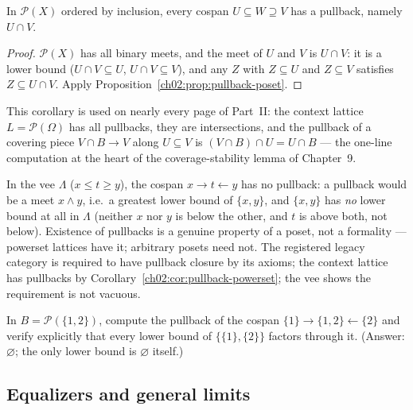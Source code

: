 \begin{corollary}\label{ch02:cor:pullback-powerset}
In $\mathcal{P}(X)$ ordered by inclusion, every cospan
$U \subseteq W \supseteq V$ has a pullback, namely $U \cap V$.
\end{corollary}

\begin{proof}
$\mathcal{P}(X)$ has all binary meets, and the meet of $U$ and $V$ is
$U \cap V$: it is a lower bound ($U \cap V \subseteq U$,
$U \cap V \subseteq V$), and any $Z$ with $Z \subseteq U$ and
$Z \subseteq V$ satisfies $Z \subseteq U \cap V$. Apply
Proposition~\ref{ch02:prop:pullback-poset}.
\end{proof}

This corollary is used on nearly every page of Part~II: the context
lattice $L = \mathcal{P}(\Omega)$ has all pullbacks, they are
intersections, and the pullback of a covering piece $V \cap B \to V$
along $U \subseteq V$ is $(V \cap B) \cap U = U \cap B$ --- the
one-line computation at the heart of the coverage-stability lemma of
Chapter~9.

\begin{example}\label{ch02:ex:no-pullback}
In the vee $\Lambda$ ($x \le t \ge y$), the cospan
$x \to t \leftarrow y$ has no pullback: a pullback would be a meet
$x \wedge y$, i.e.\ a greatest lower bound of $\{x, y\}$, and
$\{x, y\}$ has \emph{no} lower bound at all in $\Lambda$ (neither $x$
nor $y$ is below the other, and $t$ is above both, not below).
Existence of pullbacks is a genuine property of a poset, not a
formality --- powerset lattices have it; arbitrary posets need not.
The registered legacy category is required to have pullback closure by
its axioms; the context lattice has pullbacks by
Corollary~\ref{ch02:cor:pullback-powerset}; the vee shows the
requirement is not vacuous.
\end{example}

\begin{exercise}\label{ch02:exr:pullback-square}
In $B = \mathcal{P}(\{1,2\})$, compute the pullback of the cospan
$\{1\} \to \{1,2\} \leftarrow \{2\}$ and verify explicitly that every
lower bound of $\{\{1\}, \{2\}\}$ factors through it. (Answer:
$\varnothing$; the only lower bound is $\varnothing$ itself.)
\end{exercise}

\subsection{Equalizers and general limits}\label{ch02:sec:equalizers}

